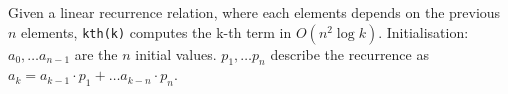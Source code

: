 Given a linear recurrence relation, where each elements depends on the previous $n$ elements, \lstinline{kth(k)} computes the k-th term in $O(n^2 \log k)$. Initialisation: $a_0, \dots a_{n-1}$ are the $n$ initial values. $p_1, \dots p_n$ describe the recurrence as $a_k = a_{k-1} \cdot p_1 + \dots a_{k-n} \cdot p_n$.
